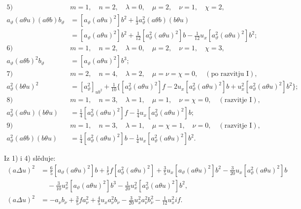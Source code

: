 \documentclass[11pt]{article}
\begin{document}
\begin{align*}
\text{5)}\quad&m=1,\quad n=2,\quad \lambda=0,\quad \mu=2,\quad \nu=1,\quad \chi=2,\\
a_\vartheta(a\theta u)(a\theta b)b_\vartheta
&=[a_\vartheta(a\theta u)^2]b^2+\frac13a_\vartheta^2(a\theta b)(b\theta u)\\
&=[a_\vartheta(a\theta u)^2]b^2+\frac1{12}[a_\vartheta^2(a\theta u)^2]b-\frac1{12}u_x[a_\vartheta^2(a\theta u)^2]b^2;\\[.6em]
\text{6)}\quad&m=1,\quad n=2,\quad \lambda=0,\quad \mu=2,\quad \nu=1,\quad \chi=3,\\
a_\vartheta(a\theta b)^2b_\vartheta&=[a_\vartheta(a\theta u)^2]b^3;\\[.6em]
\text{7)}\quad&m=2,\quad n=4,\quad \lambda=2,\quad \mu=\nu=\chi=0,\quad (\text{po razvitju I}),\\
a_\vartheta^2(b\theta u)^2&=[a_\vartheta^2]_{ub^2}+\frac1{10}\{[a_\vartheta^2(a\theta u)^2]f-2u_x[a_\vartheta^2(a\theta u)^2]b+u_x^2[a_\vartheta^2(a\theta u)^2]b^2\};\\[.6em]
\text{8)}\quad&m=1,\quad n=3,\quad \lambda=1,\quad \mu=1,\quad \nu=\chi=0,\quad (\text{razvitje I}),\\
a_\vartheta^2(a\theta u)(b\theta u)&=\frac14[a_\vartheta^2(a\theta u)^2]f-\frac14u_x[a_\vartheta^2(a\theta u)^2]b;\\[.6em]
\text{9)}\quad&m=1,\quad n=3,\quad \lambda=1,\quad \mu=\chi=1,\quad \nu=0,\quad (\text{razvitje I}),\\
a_\vartheta^2(a\theta b)(b\theta u)&=\frac14[a_\vartheta^2(a\theta u)^2]b-\frac14u_x[a_\vartheta^2(a\theta u)^2]b^2.
\end{align*}
\endgroup

Iz 1) i 4) slěduje:
\begingroup\scriptsize
\[
\begin{aligned}
(a\Delta u)^2
&=\frac65[a_\vartheta(a\theta u)^2]b+\frac15f[a_\vartheta^2(a\theta u)^2]+\frac35u_x[a_\vartheta(a\theta u)^2]b^2-\frac3{20}u_x[a_\vartheta^2(a\theta u)^2]b\\
&\quad-\frac3{10}u_x^2[a_\vartheta(a\theta u)^2]b^3-\frac1{20}u_x^2[a_\vartheta^2(a\theta u)^2]b^2,\\
(a\Delta u)^2
&=-a_\nu b_\nu+\frac35fa_\nu^2+\frac45u_xa_\nu^2b_\nu-\frac3{20}u_x^2a_\nu^2b_\nu^2-\frac1{12}u_x^2if.
\end{aligned}
\]
\endgroup
\end{document}
